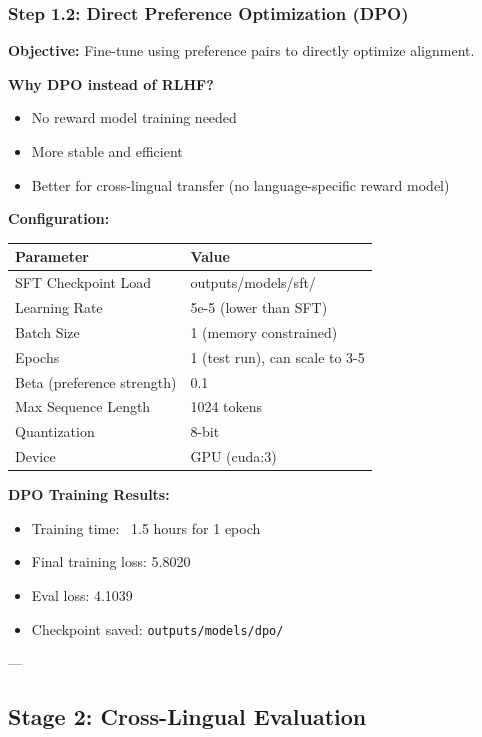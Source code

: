 \documentclass[11pt,a4paper]{article}
\begin{document}
\subsubsection{Step 1.2: Direct Preference Optimization (DPO)}

\textbf{Objective:} Fine-tune using preference pairs to directly optimize alignment.

\textbf{Why DPO instead of RLHF?}
\begin{itemize}
    \item No reward model training needed
    \item More stable and efficient
    \item Better for cross-lingual transfer (no language-specific reward model)
\end{itemize}

\textbf{Configuration:}
\begin{table}[H]
\centering
\begin{tabular}{ll}
\toprule
\textbf{Parameter} & \textbf{Value} \\
\midrule
SFT Checkpoint Load & outputs/models/sft/ \\
Learning Rate & 5e-5 (lower than SFT) \\
Batch Size & 1 (memory constrained) \\
Epochs & 1 (test run), can scale to 3-5 \\
Beta (preference strength) & 0.1 \\
Max Sequence Length & 1024 tokens \\
Quantization & 8-bit \\
Device & GPU (cuda:3) \\
\bottomrule
\end{tabular}
\end{table}

\textbf{DPO Training Results:}
\begin{itemize}
    \item Training time: ~1.5 hours for 1 epoch
    \item Final training loss: 5.8020
    \item Eval loss: 4.1039
    \item Checkpoint saved: \texttt{outputs/models/dpo/}
\end{itemize}

---

\subsection{Stage 2: Cross-Lingual Evaluation}
\end{document}
